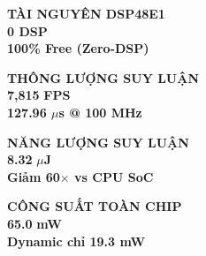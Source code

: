 \documentclass[10pt]{article}
\begin{document}
\vspace{2.5mm}

\noindent
\begin{minipage}[t]{0.158\textwidth}
    \begin{tcolorbox}[kpibox={socGreen}{socGreenLight}, width=\linewidth]
        {\fontsize{7}{8}\selectfont \textbf{\color{socGreen}TÀI NGUYÊN DSP48E1}}\\[1.5pt]
        {\fontsize{21}{23}\selectfont \textbf{\color{socGreen}0 DSP}}\\[1.5pt]
        {\fontsize{6.5}{7.5}\selectfont \textbf{\color{socGreen!80!black}100\% Free (Zero-DSP)}}
    \end{tcolorbox}
\end{minipage}\hfill
\begin{minipage}[t]{0.158\textwidth}
    \begin{tcolorbox}[kpibox={socBlue}{socCyanLight}, width=\linewidth]
        {\fontsize{7}{8}\selectfont \textbf{\color{socBlue}THÔNG LƯỢNG SUY LUẬN}}\\[1.5pt]
        {\fontsize{21}{23}\selectfont \textbf{\color{socBlue}7,815}} {\fontsize{10}{11}\selectfont \textbf{\color{socBlue}FPS}}\\[1.5pt]
        {\fontsize{6.5}{7.5}\selectfont \textbf{\color{socBlue!80!black}127.96 $\mu$s @ 100 MHz}}
    \end{tcolorbox}
\end{minipage}\hfill
\begin{minipage}[t]{0.158\textwidth}
    \begin{tcolorbox}[kpibox={socAmber}{socAmberLight}, width=\linewidth]
        {\fontsize{7}{8}\selectfont \textbf{\color{socAmber!90!black}NĂNG LƯỢNG SUY LUẬN}}\\[1.5pt]
        {\fontsize{21}{23}\selectfont \textbf{\color{socAmber!90!black}8.32}} {\fontsize{10}{11}\selectfont \textbf{\color{socAmber!90!black}$\mu$J}}\\[1.5pt]
        {\fontsize{6.5}{7.5}\selectfont \textbf{\color{socAmber!80!black}Giảm 60$\times$ vs CPU SoC}}
    \end{tcolorbox}
\end{minipage}\hfill
\begin{minipage}[t]{0.158\textwidth}
    \begin{tcolorbox}[kpibox={socRed}{socRedLight}, width=\linewidth]
        {\fontsize{7}{8}\selectfont \textbf{\color{socRed}CÔNG SUẤT TOÀN CHIP}}\\[1.5pt]
        {\fontsize{21}{23}\selectfont \textbf{\color{socRed}65.0}} {\fontsize{10}{11}\selectfont \textbf{\color{socRed}mW}}\\[1.5pt]
        {\fontsize{6.5}{7.5}\selectfont \textbf{\color{socRed!80!black}Dynamic chỉ 19.3 mW}}
    \end{tcolorbox}
\end{minipage}\hfill
\end{document}
